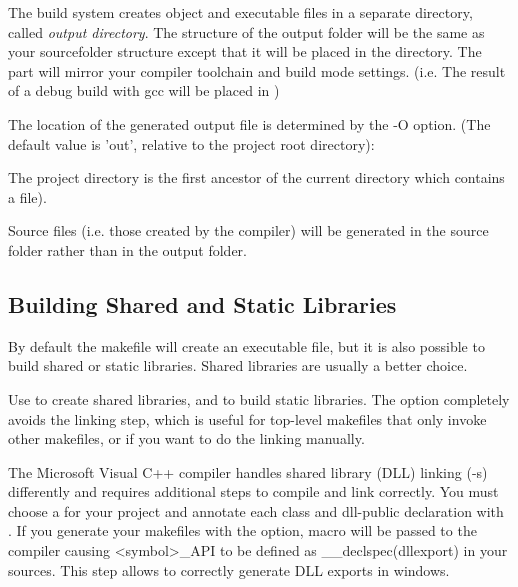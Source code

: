 The build system creates object and executable files in a separate directory, called
\textit{output directory}. The structure of the output folder will be the same as your
sourcefolder structure except that it will be placed in the  directory.
The  part will mirror your compiler toolchain and build mode settings.
(i.e. The result of a debug build with gcc will be placed in )


The location of the generated output file is determined by the -O option.
(The default value is 'out', relative to the project root directory):




\begin{note}
The project directory is the first ancestor of the current directory which
contains a  file).
\end{note}


\begin{note}
Source files (i.e. those created by the  compiler) will be generated in the
source folder rather than in the output folder.
\end{note}


\subsection{Building Shared and Static Libraries}

By default the makefile will create an executable file, but it is also
possible to build shared or static libraries. Shared libraries
are usually a better choice.

Use  to create shared libraries, and 
to build static libraries. The  option completely avoids
the linking step, which is useful for top-level makefiles that only invoke
other makefiles, or if you want to do the linking manually.

\ifcommercial
\begin{note}
The Microsoft Visual C++ compiler handles shared library (DLL) linking (-s)
differently and requires additional steps to compile and link correctly.
You must choose a  for your project and annotate each class
and dll-public declaration with . If you generate your makefiles
with the  option,  macro will be passed to
the compiler causing <symbol>\_API to be defined as \_\_declspec(dllexport) in
your sources. This step allows to correctly generate DLL exports in windows.
\end{note}
\fi


